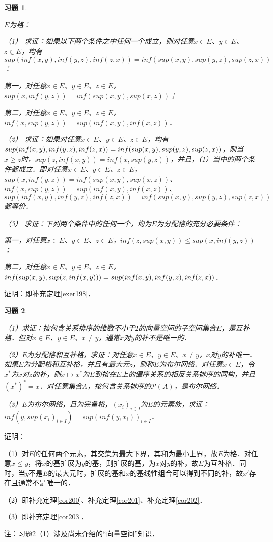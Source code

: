 \documentclass[12pt, a4paper, oneside]{book}
\newtheorem{exer}{习题}
\begin{document}
			\begin{exer}\label{exer92}
				\hfill\par
				$E$为格：
				\par
				（1）	求证：如果以下两个条件之中任何一个成立，则对任意$x\in E$、$y\in E$、$z\in E$，均有$sup(inf(x, y), inf(y, z), inf(z, x))=inf(sup(x, y), sup(y, z), sup(z, x))$：
				\par
				第一，对任意$x\in E$、$y\in E$、$z\in E$，$sup(x, inf(y, z))=inf(sup(x, y), sup(x, z))$；
				\par
				第二，对任意$x\in E$、$y\in E$、$z\in E$，$inf(x, sup(y, z))=sup(inf(x, y), inf(x, z))$．
				\par
				（2）	求证：如果对任意$x\in E$、$y\in E$、$z\in E$，均有$sup(inf(x, y), inf(y, z), inf(z, x))\\=inf(sup(x, y), sup(y, z), sup(z, x))$，则当$x\geq z$时，$sup(z, inf(x, y))=inf(x, sup(y, z))$，并且，（1）当中的两个条件都成立．即对任意$x\in E$、$y\in E$、$z\in E$，$sup(x, inf(y, z))=inf(sup(x, y), sup(x, z))$、$inf(x, sup(y, z))=sup(inf(x, y), inf(x, z))$、\\$sup(inf(x, y), inf(y, z), inf(z, x))=inf(sup(x, y), sup(y, z), sup(z, x))$都等价．
				\par
				（3）	求证：下列两个条件中的任何一个，均为$E$为分配格的充分必要条件：
				\par
				第一，对任意$x\in E$、$y\in E$、$z\in E$，$inf(z, sup(x, y))\leq sup(x, inf(y, z))$；
				\par
				第二，对任意$x\in E$、$y\in E$、$z\in E$，$inf(sup(x, y), sup(z, inf(x, y)))=\\sup(inf(x, y), inf(y, z), inf(z, x))$．
			\end{exer}
			证明：即补充定理\ref{exer198}．
			
			\begin{exer}\label{exer93}
				\hfill\par
				（1）求证：按包含关系排序的维数不小于$2$的向量空间的子空间集合$E$，是互补格．但对$x\in E$、$y\in E$、$x\neq y$，通常$x$对$y$的补不是唯一的．
				\par
				（2）$E$为分配格和互补格，求证：对任意$x\in E$、$y\in E$、$x\neq y$，$x$对$y$的补唯一．如果$E$为分配格和互补格，并且有最大元$z$，则称$E$为布尔网络．对任意$x\in E$，令$x^*$为$x$对$z$的补，则$x\mapsto x^*$为$E$到按在$E$上的偏序关系的相反关系排序的同构，并且$(x^*)^*=x$．对任意集合$A$，按包含关系排序的$\mathcal{P}(A)$，是布尔网络．
				\par
				（3）$E$为布尔网络，且为完备格，$(x_i)_{i\in I}$为$E$的元素族，求证：$inf(y, sup(x_i)_{i\in I})=sup(inf(y, x_i))_{i\in I}$．
			\end{exer}
			证明：
			\par
			（1）对$E$的任何两个元素，其交集为最大下界，其和为最小上界，故$E$为格．对任意$x\leq y$，将$x$的基扩展为$y$的基，则扩展的基，为$x$对$y$的补，故$E$为互补格．同时，当$y$不是$E$的最大元时，扩展的基和$x$的基线性组合可以得到不同的补，故$x'$存在且通常不是唯一的．
			\par
			（2）即补充定理\ref{cor200}、补充定理\ref{cor201}、补充定理\ref{cor202}．
			\par
			（3）即补充定理\ref{cor203}．
			\par
			注：习题\ref{exer93}（1）涉及尚未介绍的“向量空间”知识．
			
\end{document}
